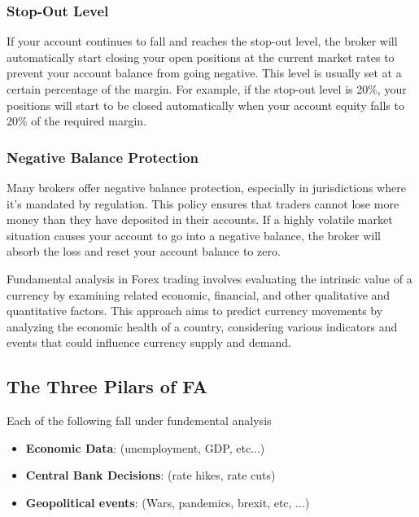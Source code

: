 \documentclass{report}
\begin{document}
     \bigbreak \noindent 
     \subsubsection{Stop-Out Level}
     \bigbreak \noindent 
    If your account continues to fall and reaches the stop-out level, the broker will automatically start closing your open positions at the current market rates to prevent your account balance from going negative. This level is usually set at a certain percentage of the margin. For example, if the stop-out level is 20\%, your positions will start to be closed automatically when your account equity falls to 20\% of the required margin.
    \bigbreak \noindent 
    \subsubsection{Negative Balance Protection}
    \bigbreak \noindent 
    Many brokers offer negative balance protection, especially in jurisdictions where it's mandated by regulation. This policy ensures that traders cannot lose more money than they have deposited in their accounts. If a highly volatile market situation causes your account to go into a negative balance, the broker will absorb the loss and reset your account balance to zero.



     \pagebreak 
     \bigbreak \noindent 
     Fundamental analysis in Forex trading involves evaluating the intrinsic value of a currency by examining related economic, financial, and other qualitative and quantitative factors. This approach aims to predict currency movements by analyzing the economic health of a country, considering various indicators and events that could influence currency supply and demand. 
     \bigbreak \noindent 
     \bigbreak \noindent 
     \subsection{The Three Pilars of FA}
     \bigbreak \noindent 
     Each of the following fall under fundemental analysis
     \begin{itemize}
         \item \textbf{Economic Data}: (unemployment, GDP, etc...)
            \item \textbf{Central Bank Decisions}: (rate hikes, rate cuts)
            \item \textbf{Geopolitical events}: (Wars, pandemics, brexit, etc, ...)
     \end{itemize}
     \bigbreak \noindent 
\end{document}
